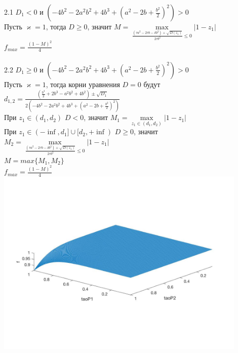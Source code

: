 \documentclass[a4paper]{article}
\begin{document}
 2.1 $D_1 <  0$ и $(-4b^2-2a^2b^2+4b^3+(a^2-2b+\frac{b^2}{2})^2) > 0$\\
 Пусть $\varkappa = 1$, тогда $D \geq 0$, значит $M = \max\limits_{\frac{(\tau a^2-2 \tau b - \delta b^2)+\sqrt{D(z_1)}}{2\tau b^2}  \leq 0  }{|1-z_1|}$\\
 $f_{max} = \frac{(1-M)^2}{4}$\\\\
 
  2.2 $D_1 \geq 0$ и $(-4b^2-2a^2b^2+4b^3+(a^2-2b+\frac{b^2}{2})^2) > 0$\\
 Пусть $\varkappa = 1$, тогда корни уравнения $D = 0$ будут $d_{1,2} = \frac{(\frac{b^4}{2}+2b^3-a^2b^2+4b^2)\pm\sqrt{D_1}}{2(-4b^2-2a^2b^2+4b^3+(a^2-2b+\frac{b^2}{2})^2)}$\\
 При $z_1\in(d_1, d_2)$ $ D < 0$, значит $M_1 = \max\limits_{z_1\in(d_1, d_2)}{|1-z_1|}$\\
 При $z_1\in(-\inf, d_1]\cup[d_2, +\inf)$ $ D \geq 0$, значит $M_2 = \max\limits_{\frac{(\tau a^2-2 \tau b - \delta b^2)+\sqrt{D(z_1)}}{2\tau b^2}  \leq 0  }{|1-z_1|}$\\
 $M = max\{ M_1, M_2\}$\\
 $f_{max} = \frac{(1-M)^2}{4}$\\
 
\includegraphics[width=12cm]{Images/filter1.jpg}
 
\end{document}
